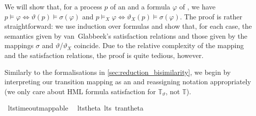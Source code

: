 %
\begin{isabellebody}%
%
%
\isadelimtheory
%
\endisadelimtheory
%
\isatagtheory
%
\endisatagtheory
{\isafoldtheory}%
%
\isadelimtheory
%
\endisadelimtheory
%
\isadelimdocument
%
\endisadelimdocument
%
\isatagdocument
%
\isamarkuptrue%
%
\endisatagdocument
{\isafolddocument}%
%
\isadelimdocument
%
\endisadelimdocument
%
\begin{isamarkuptext}%
\label{sec:reduction_satisfaction}%
\end{isamarkuptext}\isamarkuptrue%
%
\begin{isamarkuptext}%
We will show that, for a process $p$ of an \LTSt{} and a formula $\varphi$ of \HMLt{}, we have $p \vDash \varphi \iff \vartheta(p) \vDash \sigma(\varphi)$ and $p \vDash_X \varphi \iff \vartheta_X(p) \vDash \sigma(\varphi)$. The proof is rather straightforward: we use induction over \HMLt{} formulas and show that, for each case, the semantics given by van~Glabbeek's satisfaction relations and those given by the mappings $\sigma$ and $\vartheta$/$\vartheta_X$ coincide. Due to the relative complexity of the mapping and the satisfaction relations, the proof is quite tedious, however.
\vspace{-.3cm}%
\end{isamarkuptext}\isamarkuptrue%
%
\isadelimdocument
%
\endisadelimdocument
%
\isatagdocument
%
\isamarkuptrue%
%
\endisatagdocument
{\isafolddocument}%
%
\isadelimdocument
%
\endisadelimdocument
%
\begin{isamarkuptext}%
\vspace{-.4cm}
Similarly to the formalisations in \cref{sec:reduction_bisimilarity}, we begin by interpreting our transition mapping  as an  and reassigning notation appropriately (we only care about HML formula satisfaction for $\mathbb{T}_\vartheta$, not $\mathbb{T}$).%
\end{isamarkuptext}\isamarkuptrue%
\isamarkupfalse%
\ lts{\isacharunderscore}{\kern0pt}timeout{\isacharunderscore}{\kern0pt}mappable\ \isanewline
\isanewline
{}\isamarkupfalse%
\ lts{\isacharunderscore}{\kern0pt}theta{\isacharcolon}{\kern0pt}\ lts\ tran{\isacharunderscore}{\kern0pt}theta%
\isadelimproof
\ %
\endisadelimproof
%
\isatagproof
\isacommand{{\isachardot}{\kern0pt}}\isamarkupfalse%

\end{isabellebody}
